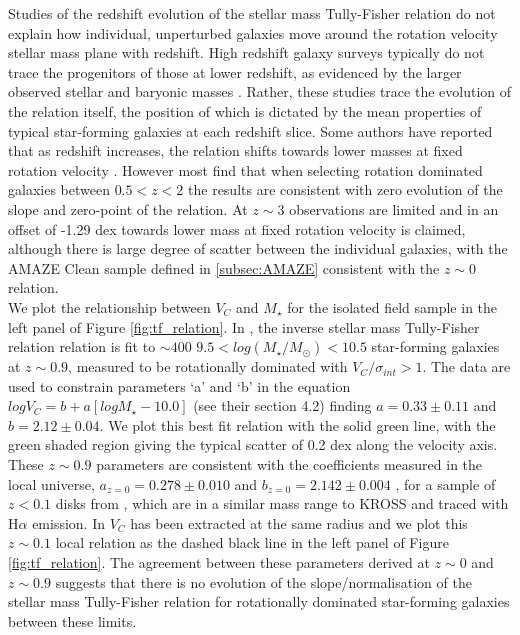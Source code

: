 \documentclass[fleqn,usenatbib]{mn2e}
\begin{document}
Studies of the redshift evolution of the stellar mass Tully-Fisher relation do not explain how individual, unperturbed galaxies move around the rotation velocity stellar mass plane with redshift. 
High redshift galaxy surveys typically do not trace the progenitors of those at lower redshift, as evidenced by the larger observed stellar and baryonic masses \citep[e.g.][]{Cresci2009,Reyes2011,Wisnioski2015,Ubler2017}.
Rather, these studies trace the evolution of the relation itself, the position of which is dictated by the mean properties of typical star-forming galaxies at each redshift slice.
Some authors have reported that as redshift increases, the relation shifts towards lower masses at fixed rotation velocity \citep[e.g.][]{Puech2008,Cresci2009,Puech2010,Straatman2017,Ubler2017}.
However most find that when selecting rotation dominated galaxies between $0.5 < z < 2$ \citep[e.g.][]{Flores2006,Miller2011,Kassin2012,Miller2012,Vergani2012,Miller2014,Contini2015a,Molina2016,DiTeodoro2016,Simons2016,Pelliccia2017,Harrison2017} the results are consistent with zero evolution of the slope and zero-point of the relation.
At $z\sim 3$ observations are limited and in \cite{Gnerucci2011} an offset of -1.29 dex towards lower mass at fixed rotation velocity is claimed, although there is large degree of scatter between the individual galaxies, with the AMAZE Clean sample defined in \cref{subsec:AMAZE} consistent with the $z\sim0$ relation. \\

We plot the relationship between $V_{C}$ and $M_{\star}$ for the isolated field sample in the left panel of Figure \ref{fig:tf_relation}.
In \cite{Harrison2017}, the inverse stellar mass Tully-Fisher relation relation is fit to $\sim400$ $9.5 < log(M_{\star}/M_{\odot}) < 10.5$ star-forming galaxies at $z\sim0.9$, measured to be rotationally dominated with $V_{C}/\sigma_{int} > 1$.
The data are used to constrain parameters `a' and `b' in the equation $logV_{C}=b+a[logM_{\star} - 10.0]$ (see their section 4.2) finding $a = 0.33 \pm 0.11$ and $b = 2.12 \pm 0.04$.
We plot this best fit relation with the solid green line, with the green shaded region giving the typical scatter of 0.2 dex along the velocity axis.
These $z\sim0.9$ parameters are consistent with the coefficients measured in the local universe, $a_{z=0} = 0.278 \pm 0.010$ and $b_{z=0} = 2.142 \pm 0.004$ , for a sample of $z<0.1$ disks from \cite{Reyes2011}, which are in a similar mass range to KROSS and traced with H$\alpha$ emission.
In \citep{Reyes2011} $V_{C}$ has been extracted at the same radius and we plot this $z\sim 0.1$ local relation as the dashed black line in the left panel of Figure \ref{fig:tf_relation}.
The agreement between these parameters derived at $z\sim0$ and $z\sim0.9$ suggests that there is no evolution of the slope/normalisation of the stellar mass Tully-Fisher relation for rotationally dominated star-forming galaxies between these limits. \\
\end{document}

